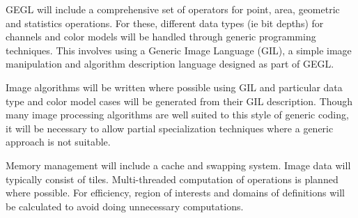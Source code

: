 GEGL will include a comprehensive set of operators for point, area, geometric
and statistics operations. For these, different data types (ie bit depths) for
channels and color models will be handled through generic programming
techniques. This involves using a Generic Image Language (GIL), a simple image
manipulation and algorithm description language designed as part of GEGL.  

Image algorithms will be written where possible using GIL and particular data
type and color model cases will be generated from their GIL description.
Though many image processing algorithms are well suited to this style of
generic coding, it will be necessary to allow partial specialization techniques
where a generic approach is not suitable. 

Memory management will include a cache and swapping system. Image data will
typically consist of tiles. Multi-threaded computation of operations is planned
where possible. For efficiency, region of interests and domains of definitions
will be calculated to avoid doing unnecessary computations.  
